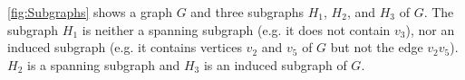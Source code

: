 \begin{Example}\label{ex:Subgraphs}
\cref{fig:Subgraphs} shows a graph $G$ and three subgraphs $H_1$, $H_2$, and $H_3$ of $G$. The subgraph $H_1$ is neither a spanning subgraph (e.g. it does not contain $v_3$), nor an induced subgraph (e.g. it contains vertices $v_2$ and $v_5$ of $G$ but not the edge $v_2 v_5$). $H_2$ is a spanning subgraph and $H_3$ is an induced subgraph of $G$.
\begin{figure}[!htbp]
\centering
{} \hfill

\end{figure}
\end{Example}
